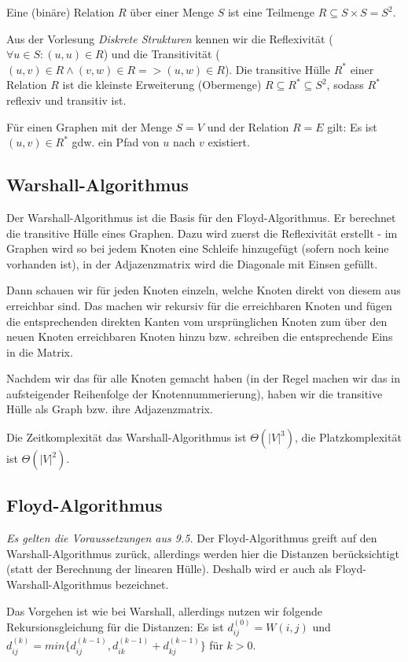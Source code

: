 \documentclass[12pt]{article}
\begin{document}
Eine (binäre) Relation $R$ über einer Menge $S$ ist eine Teilmenge $R \subseteq S \times S = S^2$.

Aus der Vorlesung \textit{Diskrete Strukturen} kennen wir die Reflexivität ($\forall u \in S : (u, u) \in R$) und die Transitivität ($(u, v) \in R \land (v, w) \in R => (u, w) \in R$). Die transitive Hülle $R^*$ einer Relation $R$ ist die kleinste Erweiterung (Obermenge) $R \subseteq R^* \subseteq S^2$, sodass $R^*$ reflexiv und transitiv ist.

Für einen Graphen mit der Menge $S = V$ und der Relation $R = E$ gilt: Es ist $(u, v) \in R^*$ gdw. ein Pfad von $u$ nach $v$ existiert.

\subsection{Warshall-Algorithmus}

Der Warshall-Algorithmus ist die Basis für den Floyd-Algorithmus. Er berechnet die transitive Hülle eines Graphen. Dazu wird zuerst die Reflexivität erstellt - im Graphen wird so bei jedem Knoten eine Schleife hinzugefügt (sofern noch keine vorhanden ist), in der Adjazenzmatrix wird die Diagonale mit Einsen gefüllt.

Dann schauen wir für jeden Knoten einzeln, welche Knoten direkt von diesem aus erreichbar sind. Das machen wir rekursiv für die erreichbaren Knoten und fügen die entsprechenden direkten Kanten vom ursprünglichen Knoten zum über den neuen Knoten erreichbaren Knoten hinzu bzw. schreiben die entsprechende Eins in die Matrix.

Nachdem wir das für alle Knoten gemacht haben (in der Regel machen wir das in aufsteigender Reihenfolge der Knotennummerierung), haben wir die transitive Hülle als Graph bzw. ihre Adjazenzmatrix.

Die Zeitkomplexität das Warshall-Algorithmus ist $\Theta(|V|^3)$, die Platzkomplexität ist $\Theta(|V|^2)$.

\subsection{Floyd-Algorithmus}

\textit{Es gelten die Voraussetzungen aus 9.5.} Der Floyd-Algorithmus greift auf den Warshall-Algorithmus zurück, allerdings werden hier die Distanzen berücksichtigt (statt der Berechnung der linearen Hülle). Deshalb wird er auch als Floyd-Warshall-Algorithmus bezeichnet.

Das Vorgehen ist wie bei Warshall, allerdings nutzen wir folgende Rekursionsgleichung für die Distanzen: Es ist $d_{ij}^{(0)} = W(i, j)$ und $d_{ij}^{(k)} = min \{d_{ij}^{(k-1)}, d_{ik}^{(k-1)} + d_{kj}^{(k-1)}\}$ für $k > 0$.
\end{document}
